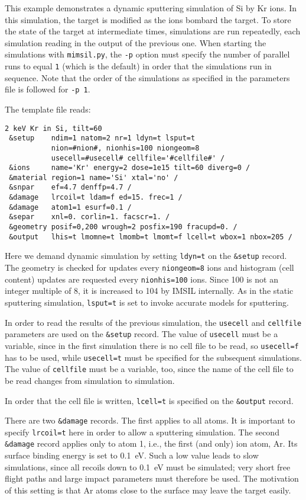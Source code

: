 This example demonstrates a dynamic sputtering simulation of Si by Kr ions. In
this simulation, the target is modified as the ions bombard the target. To store
the state of the target at intermediate times, simulations are run repeatedly,
each simulation reading in the output of the previous one. When starting the
simulations with \texttt{mimsil.py}, the \texttt{-p} option must specify the
number of parallel runs to equal \texttt{1} (which is the default) in
order that the simulations run in sequence. Note that the order of the
simulations as specified in the parameters file is followed for \texttt{-p 1}.

The template file reads:

\begin{verbatim}
2 keV Kr in Si, tilt=60
 &setup    ndim=1 natom=2 nr=1 ldyn=t lsput=t 
           nion=#nion#, nionhis=100 niongeom=8  
           usecell=#usecell# cellfile='#cellfile#' /
 &ions     name='Kr' energy=2 dose=1e15 tilt=60 diverg=0 /
 &material region=1 name='Si' xtal='no' /
 &snpar    ef=4.7 denffp=4.7 /
 &damage   lrcoil=t ldam=f ed=15. frec=1 /
 &damage   atom1=1 esurf=0.1 /
 &separ    xnl=0. corlin=1. facscr=1. /
 &geometry posif=0,200 wrough=2 posfix=190 fracupd=0. /
 &output   lhis=t lmomne=t lmomb=t lmomt=f lcell=t wbox=1 nbox=205 /
\end{verbatim}

Here we demand dynamic simulation by setting \texttt{ldyn=t} on the
\texttt{\&setup} record. 
The geometry is checked for updates every \texttt{niongeom=8} ions and
histogram (cell content) updates are requested every \texttt{nionhis=100} ions.
Since 100 is not an integer multiple of 8, it is increased to 104 by IMSIL
internally.
As in the static sputtering simulation, \texttt{lsput=t} is set to invoke
accurate models for sputtering.

In order to read the results of the previous simulation, the \texttt{usecell}
and \texttt{cellfile} parameters are used on the \texttt{\&setup} record. The
value of \texttt{usecell} must be a variable, since in the first simulation
there is no cell file to be read, so \texttt{usecell=f} has to be used, while
\texttt{usecell=t} must be specified for the subsequent simulations. The value
of \texttt{cellfile} must be a variable, too, since the name of the cell file to
be read changes from simulation to simulation.

In order that the cell file is written, \texttt{lcell=t} is specified on the
\texttt{\&output} record.

There are two \texttt{\&damage} records. The first applies to all atoms. It is
important to specify \texttt{lrcoil=t} here in order to allow a sputtering
simulation. The second \texttt{\&damage} record applies only to atom 1, i.e.,
the first (and only) ion atom, Ar. Its surface binding energy is set to
0.1~eV. Such a low value leads to slow simulations, since all recoils down to
0.1~eV must be simulated; very short free flight paths and large impact
parameters must therefore be used. The motivation of this setting is that Ar
atoms close to the surface may leave the target easily.

